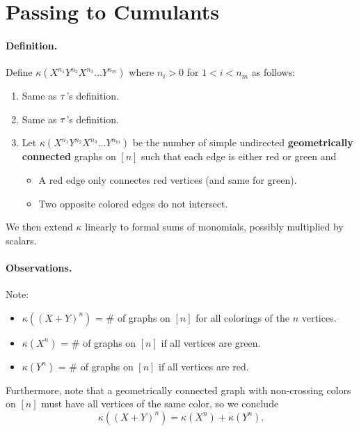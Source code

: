 \section{Passing to Cumulants}
\paragraph{Definition.} Define $\kappa(X^{n_1}Y^{n_2}X^{n_3}\dots Y^{n_m})$ where $n_i > 0$ for $1 < i < n_m$ as follows:
\begin{enumerate}
    \item Same as $\tau$'s definition.
    \item Same as $\tau$'s definition.
    \item Let $\kappa(X^{n_1}Y^{n_2}X^{n_3}\dots Y^{n_m})$ be the number of simple undirected \textbf{geometrically connected} graphs on $[n]$ such that each edge is either red or green and
    \begin{itemize}
        \item A red edge only connectes red vertices (and same for green).
        \item Two opposite colored edges do not intersect.
    \end{itemize}
\end{enumerate}
We then extend $\kappa$ linearly to formal sums of monomials, possibly multiplied by scalars.

\paragraph{Observations.} Note:
\begin{itemize}
    \item $\kappa\left( (X+Y)^n \right)$ = \# of graphs on $[n]$ for all colorings of the $n$ vertices.
    \item $\kappa\left( X^n \right)$ = \# of graphs on $[n]$ if all vertices are green.
    \item $\kappa\left( Y^n \right)$ = \# of graphs on $[n]$ if all vertices are red.
\end{itemize}
Furthermore, note that a geometrically connected graph with non-crossing colors on $[n]$ must have all vertices of the same color, so we conclude
\[
    \kappa\left( (X+Y)^n \right) = \kappa(X^n) + \kappa(Y^n).
\]

